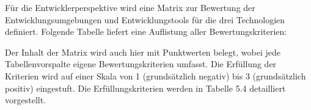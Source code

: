 Für die Entwicklerperspektive wird eine Matrix zur Bewertung der Entwicklungsumgebungen und Entwicklungstools für die drei Technologien definiert. Folgende Tabelle liefert eine Auflistung aller Bewertungskriterien: 
\begin{table}[htbp]\scriptsize
    \centering
    \setlength{\leftmargini}{0.4cm}
  \caption{Bewertungsmatrix aus der Entwickler-Perspektive} 
\end{table}

Der Inhalt der Matrix wird auch hier mit Punktwerten belegt, wobei jede Tabellenvorspalte eigene Bewertungskriterien umfasst. Die Erfüllung der Kriterien wird auf einer Skala von 1 (grundsätzlich negativ) bis 3 (grundsätzlich positiv) eingestuft. Die Erfüllungskriterien werden in Tabelle 5.4 detailliert vorgestellt.


